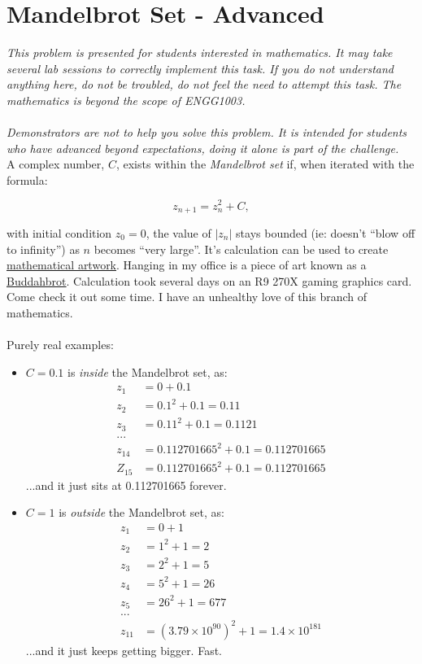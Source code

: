 \documentclass{lab}
\begin{document}
\pagebreak
\section{Mandelbrot Set - Advanced}
\textit{This problem is presented for students interested in mathematics. It may take several lab sessions to correctly implement this task. If you do not understand anything here, do not be troubled, do not feel the need to attempt this task. The mathematics is beyond the scope of ENGG1003.} \\ \\
\textit{Demonstrators are not to help you solve this problem. It is intended for students who have advanced beyond expectations, doing it alone is part of the challenge.}\\

A complex number, $C$, exists within the \textit{Mandelbrot set} if, when iterated with the formula:

\begin{equation}
z_{n+1} = z^2_n + C,
\end{equation}

with initial condition $z_0 = 0$, the value of $\left|z_n\right|$ stays bounded (ie: doesn't ``blow off to infinity'') as $n$ becomes ``very large''. It's calculation can be used to create \underline{\href{https://www.google.com.au/search?q=mandelbrot+set}{mathematical artwork}}. Hanging in my office is a piece of art known as a \underline{\href{https://www.google.com.au/search?q=buddahbrot}{Buddahbrot}}. Calculation took several days on an R9 270X gaming graphics card. Come check it out some time. I have an unhealthy love of this branch of mathematics.
\\ \\
Purely real examples:
\begin{itemize}
\item $C = 0.1$ is \textit{inside} the Mandelbrot set, as:
\begin{align}
z_1 &= 0 + 0.1 \\
z_2 &= 0.1^2 + 0.1 = 0.11 \\
z_3 &= 0.11^2 + 0.1 = 0.1121 \\
... \\
z_{14} &= 0.112701665^2 + 0.1 = 0.112701665 \\
Z_{15} &= 0.112701665^2 + 0.1 = 0.112701665 
\end{align}
...and it just sits at 0.112701665 forever.
\item $C = 1$ is \textit{outside} the Mandelbrot set, as:
\begin{align}
z_1 &= 0 + 1 \\
z_2 &= 1^2 + 1 = 2 \\
z_3 &= 2^2 + 1 = 5 \\
z_4 &= 5^2 + 1 = 26 \\
z_5 &= 26^2 + 1 = 677 \\
... \\
z_{11} &= (3.79 \times 10^{90})^2 + 1 = 1.4 \times 10^{181}
\end{align}
...and it just keeps getting bigger. Fast.
\end{itemize}
\end{document}
